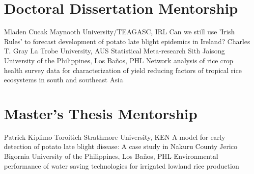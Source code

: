 \section*{Doctoral Dissertation Mentorship}
\begin{entrylist}
    {Mladen Cucak {}}
    {Maynooth University/TEAGASC, IRL}
    {Can we still use 'Irish Rules' to forecast development of potato late blight epidemics in Ireland?}
    {Charles T. Gray {}}
    {La Trobe University, AUS}
    {Statistical Meta-research}
    {Sith Jaisong {}}
    {University of the Philippines, Los Ba\~nos, PHL}
    {Network analysis of rice crop health survey data for characterization of yield reducing factors of tropical rice ecosystems in south and southeast Asia}
\end{entrylist}

\section*{Master's Thesis Mentorship}
\begin{entrylist}
    {Patrick Kiplimo Toroitich {}}
    {Strathmore University, KEN}
    {A model for early detection of potato late blight disease: A case study in Nakuru County}
    {Jerico Bigornia {}}
    {University of the Philippines, Los Ba\~nos, PHL}
    {Environmental performance of water saving technologies for irrigated lowland rice production}
\end{entrylist}
